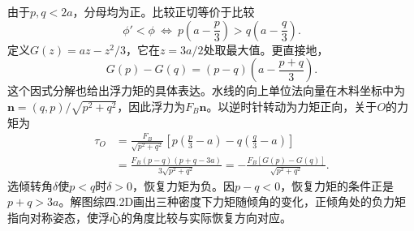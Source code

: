 \documentclass[UTF8,fontset=fandol,a4paper,11pt]{ctexart}
\begin{document}
由于$p,q<2a$，分母均为正。比较正切等价于比较
\[
\phi'<\phi
\ \Longleftrightarrow\
p\left(a-\frac p3\right)>
q\left(a-\frac q3\right).
\]
定义$G(z)=az-z^2/3$，它在$z=3a/2$处取最大值。更直接地，
\[
G(p)-G(q)=(p-q)\left(a-\frac{p+q}{3}\right).
\]
这个因式分解也给出浮力矩的具体表达。水线的向上单位法向量在木料坐标中为$\boldsymbol n=(q,p)/\sqrt{p^2+q^2}$，因此浮力为$F_B\boldsymbol n$。以逆时针转动为力矩正向，关于$O$的力矩为
\[
\begin{aligned}
\tau_O&=\frac{F_B}{\sqrt{p^2+q^2}}\left[
p\left(\frac p3-a\right)-q\left(\frac q3-a\right)\right]\\
&=\frac{F_B(p-q)(p+q-3a)}{3\sqrt{p^2+q^2}}
=-\frac{F_B[G(p)-G(q)]}{\sqrt{p^2+q^2}}.
\end{aligned}
\]
选倾转角$\delta$使$p<q$时$\delta>0$，恢复力矩为负。因$p-q<0$，恢复力矩的条件正是$p+q>3a$。解图综四.2D画出三种密度下力矩随倾角的变化，正倾角处的负力矩指向对称姿态，使浮心的角度比较与实际恢复方向对应。
\end{document}
